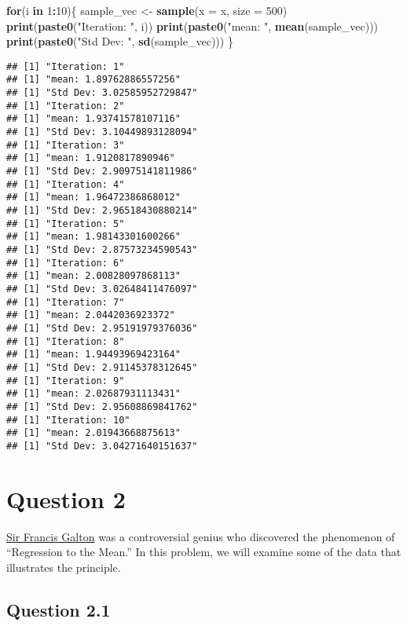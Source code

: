 \documentclass[]{article}
\newenvironment{Shaded}{\begin{snugshade}}{\end{snugshade}}
\newcommand{\KeywordTok}[1]{\textcolor[rgb]{0.13,0.29,0.53}{\textbf{#1}}}
\newcommand{\DataTypeTok}[1]{\textcolor[rgb]{0.13,0.29,0.53}{#1}}
\newcommand{\DecValTok}[1]{\textcolor[rgb]{0.00,0.00,0.81}{#1}}
\newcommand{\StringTok}[1]{\textcolor[rgb]{0.31,0.60,0.02}{#1}}
\newcommand{\ControlFlowTok}[1]{\textcolor[rgb]{0.13,0.29,0.53}{\textbf{#1}}}
\newcommand{\OperatorTok}[1]{\textcolor[rgb]{0.81,0.36,0.00}{\textbf{#1}}}
\newcommand{\NormalTok}[1]{#1}
\begin{document}
\begin{Shaded}
\begin{Highlighting}[]
\ControlFlowTok{for}\NormalTok{(i }\ControlFlowTok{in} \DecValTok{1}\OperatorTok{:}\DecValTok{10}\NormalTok{)\{}
\NormalTok{  sample_vec <-}\StringTok{ }\KeywordTok{sample}\NormalTok{(}\DataTypeTok{x =}\NormalTok{ x, }\DataTypeTok{size =} \DecValTok{500}\NormalTok{)}
  \KeywordTok{print}\NormalTok{(}\KeywordTok{paste0}\NormalTok{(}\StringTok{"Iteration: "}\NormalTok{, i))}
  \KeywordTok{print}\NormalTok{(}\KeywordTok{paste0}\NormalTok{(}\StringTok{"mean: "}\NormalTok{, }\KeywordTok{mean}\NormalTok{(sample_vec)))}
  \KeywordTok{print}\NormalTok{(}\KeywordTok{paste0}\NormalTok{(}\StringTok{"Std Dev: "}\NormalTok{, }\KeywordTok{sd}\NormalTok{(sample_vec)))}
\NormalTok{\}}
\end{Highlighting}
\end{Shaded}

\begin{verbatim}
## [1] "Iteration: 1"
## [1] "mean: 1.89762886557256"
## [1] "Std Dev: 3.02585952729847"
## [1] "Iteration: 2"
## [1] "mean: 1.93741578107116"
## [1] "Std Dev: 3.10449893128094"
## [1] "Iteration: 3"
## [1] "mean: 1.9120817890946"
## [1] "Std Dev: 2.90975141811986"
## [1] "Iteration: 4"
## [1] "mean: 1.96472386868012"
## [1] "Std Dev: 2.96518430880214"
## [1] "Iteration: 5"
## [1] "mean: 1.98143301600266"
## [1] "Std Dev: 2.87573234590543"
## [1] "Iteration: 6"
## [1] "mean: 2.00828097868113"
## [1] "Std Dev: 3.02648411476097"
## [1] "Iteration: 7"
## [1] "mean: 2.0442036923372"
## [1] "Std Dev: 2.95191979376036"
## [1] "Iteration: 8"
## [1] "mean: 1.94493969423164"
## [1] "Std Dev: 2.91145378312645"
## [1] "Iteration: 9"
## [1] "mean: 2.02687931113431"
## [1] "Std Dev: 2.95608869841762"
## [1] "Iteration: 10"
## [1] "mean: 2.01943668875613"
## [1] "Std Dev: 3.04271640151637"
\end{verbatim}

\section{Question 2}\label{question-2}

\href{https://en.wikipedia.org/wiki/Francis_Galton}{Sir Francis Galton}
was a controversial genius who discovered the phenomenon of ``Regression
to the Mean.'' In this problem, we will examine some of the data that
illustrates the principle.

\subsection{Question 2.1}\label{question-2.1}
\end{document}
